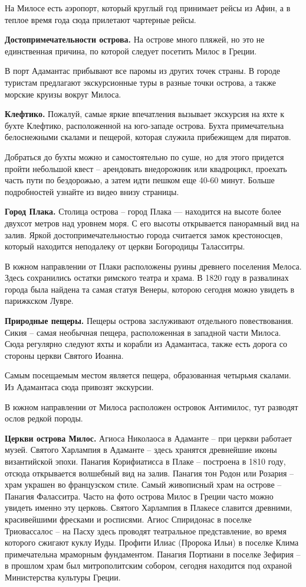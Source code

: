 На Милосе есть аэропорт, который круглый год принимает рейсы из Афин, а в теплое время года сюда прилетают чартерные рейсы.

\textbf{Достопримечательности острова.}
На острове много пляжей, но это не единственная причина, по которой следует посетить Милос в Греции.

В порт Адамантас прибывают все паромы из других точек страны. В городе туристам предлагают экскурсионные туры в разные точки острова, а также морские круизы вокруг Милоса.

\textbf{ Клефтико.}
Пожалуй, самые яркие впечатления вызывает экскурсия на яхте к бухте Клефтико, расположенной на юго-западе острова. Бухта примечательна белоснежными скалами и пещерой, которая служила прибежищем для пиратов.

Добраться до бухты можно и самостоятельно по суше, но для этого придется пройти небольшой квест – арендовать внедорожник или квадроцикл, проехать часть пути по бездорожью, а затем идти пешком еще 40-60 минут. Больше подробностей узнайте из видео внизу страницы.

\textbf{Город Плака.}
Столица острова – город Плака — находится на высоте более двухсот метров над уровнем моря. С его высоты открывается панорамный вид на залив. Яркой достопримечательностью города считается замок крестоносцев, который находится неподалеку от церкви Богородицы Таласситры.

В южном направлении от Плаки расположены руины древнего поселения Мелоса. Здесь сохранились остатки римского театра и храма. В 1820 году в развалинах города была найдена та самая статуя Венеры, которою сегодня можно увидеть в парижкском Лувре.

\textbf{Природные пещеры.}
Пещеры острова заслуживают отдельного повествования. Сикия – самая необычная пещера, расположенная в западной части Милоса. Сюда регулярно следуют яхты и корабли из Адамантаса, также есть дорога со стороны церкви Святого Иоанна.

Самым посещаемым местом является пещера, образованная четырьмя скалами. Из Адамантаса сюда привозят экскурсии.

В южном направлении от Милоса расположен островок Антимилос, тут разводят ослов редкой породы.

\textbf{Церкви острова Милос.}
Агиоса Николаоса в Адаманте – при церкви работает музей. Святого Харлампия в Адаманте – здесь хранятся древнейшие иконы византийской эпохи. Панагия Корифиатисса в Плаке – построена в 1810 году, отсюда открывается волшебный вид на залив. Панагия тон Родон или Розария – храм украшен во французском стиле. Самый живописный храм на острове – Панагия Фаласситра. Часто на фото острова Милос в Греции часто можно увидеть именно эту церковь. Святого Харлампия в Плакесе славится древними, красивейшими фресками и росписями. Агиос Спиридонас в поселке Триовассалос – на Пасху здесь проводят театральное представление, во время которого сжигают куклу Иуды.
Профити Илиас (Пророка Ильи) в поселке Клима примечательна мраморным фундаментом.
Панагия Портиани в поселке Зефирия – в прошлом храм был митрополитским собором, сегодня находится под охраной Министерства культуры Греции.

